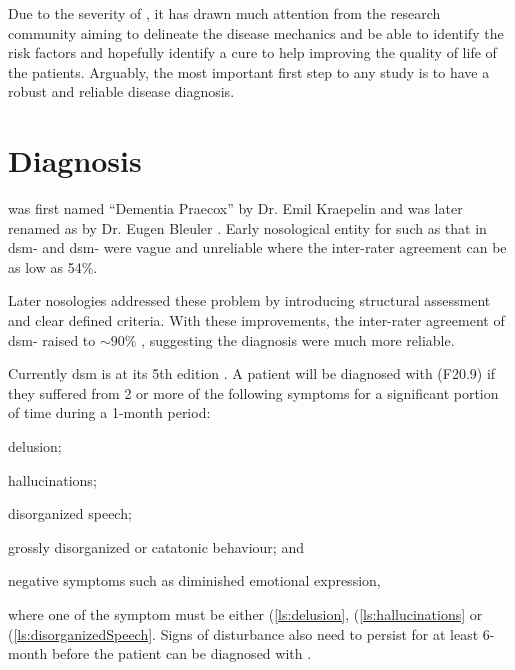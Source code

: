 	Due to the severity of , it has drawn much attention from the research community aiming to delineate the disease mechanics and be able to identify the risk factors and hopefully identify a cure to help improving the quality of life of the patients.
	Arguably, the most important first step to any  study is to have a robust and reliable disease diagnosis.
	
	\section{Diagnosis}
	 was first named ``Dementia Praecox'' by Dr. Emil Kraepelin and was later renamed as  by Dr. Eugen Bleuler \citep{Jablensky2010}.
	Early nosological entity for  such as that in \gls{dsm}- and \gls{dsm}- were vague and unreliable where the inter-rater agreement can be as low as 54\%. \citep{Tsuang2000,Harvey2012} 
	
	Later nosologies addressed these problem by introducing structural assessment and clear defined criteria. 
	With these improvements, the inter-rater agreement of \gls{dsm}- raised to $\sim 90\%$ \citep{Harvey2012}, suggesting the diagnosis were much more reliable.
	
	Currently \gls{dsm} is at its 5th edition \citep{AmericanPsychiatricAssociation2013}. 
	A patient will be diagnosed with  (F20.9) if they suffered from 2 or more of the following symptoms for a significant portion of time during a 1-month period: 
	\begin{enumerate*}[label=\arabic*\upshape)]
		\item delusion; \label{ls:delusion}
		\item hallucinations;\label{ls:hallucinations}
		\item disorganized speech;\label{ls:disorganizedSpeech}
		\item grossly disorganized or catatonic behaviour; and\label{ls:catatonicBehavior}
		\item negative symptoms such as diminished emotional expression,\label{ls:negativeSymptoms}
	\end{enumerate*}  where one of the symptom must be either (\ref{ls:delusion}, (\ref{ls:hallucinations} or (\ref{ls:disorganizedSpeech}.
	Signs of disturbance also need to persist for at least 6-month before the patient can be diagnosed with .
	
